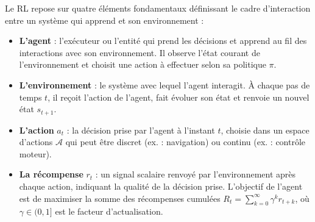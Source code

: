 Le RL repose sur quatre éléments fondamentaux définissant le cadre 
d'interaction entre un système qui apprend et son environnement :
\begin{itemize}[noitemsep, topsep=4pt]
    \item \textbf{L'agent} : l'exécuteur ou l'entité qui prend les décisions et apprend au fil des interactions avec son environnement. Il observe l'état courant de l'environnement et 
    choisit une action à effectuer selon sa politique $\pi$.
    \item \textbf{L'environnement} : le système avec lequel l'agent interagit. À chaque pas de temps $t$, il reçoit l'action de l'agent, fait évoluer son état et renvoie un nouvel état $s_{t+1}$.
    \item \textbf{L'action} $a_t$ : la décision prise par l'agent à l'instant 
    $t$, choisie dans un espace d'actions $\mathcal{A}$ qui peut être discret 
    (ex. : navigation) ou continu (ex. : contrôle moteur).
    \item \textbf{La récompense} $r_t$ : un signal scalaire renvoyé par 
    l'environnement après chaque action, indiquant la qualité de la décision 
    prise. L'objectif de l'agent est de maximiser la somme des récompenses 
    cumulées $R_t = \sum_{k=0}^{\infty} \gamma^k r_{t+k}$, où $\gamma \in 
    (0,1]$ est le facteur d'actualisation.
\end{itemize}

\vspace{0.5cm}



